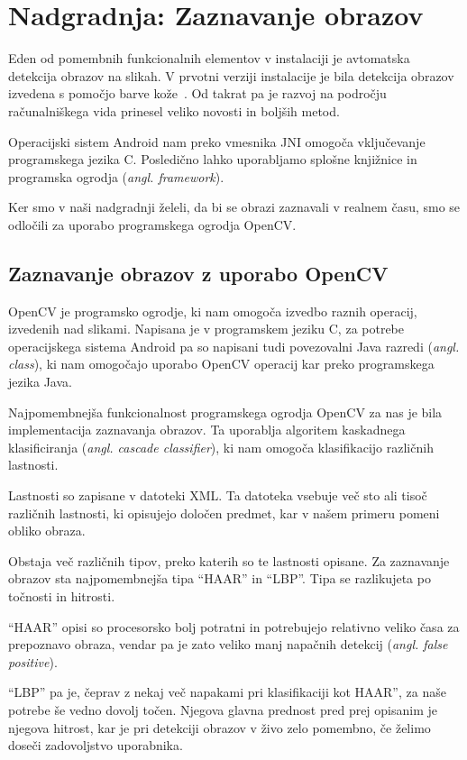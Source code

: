 \chapter{Nadgradnja: Zaznavanje obrazov}
\label{ch:zaznavanjeObrazov}
Eden od pomembnih funkcionalnih elementov v instalaciji je avtomatska
detekcija  obrazov na slikah. V prvotni verziji instalacije je bila detekcija
obrazov izvedena s pomočjo barve kože~\cite{mirage03}. Od takrat pa je razvoj
na področju računalniškega vida prinesel veliko novosti in boljših metod.

Operacijski sistem Android nam preko vmesnika JNI omogoča vključevanje
programskega jezika C. Posledično lahko uporabljamo splošne knjižnice in
programska ogrodja (\textit{angl. framework}).

Ker smo v naši nadgradnji želeli, da bi se obrazi zaznavali v realnem času,
smo se odločili za uporabo programskega ogrodja OpenCV.


\section{Zaznavanje obrazov z uporabo OpenCV}
\label{sec:zaznavanjeObrazovOpenCV}
OpenCV je programsko ogrodje, ki nam omogoča izvedbo raznih operacij,
izvedenih nad slikami. Napisana je v programskem jeziku C, za potrebe
operacijskega sistema Android pa so napisani tudi povezovalni Java razredi
(\textit{angl. class}), ki nam omogočajo uporabo OpenCV operacij kar preko
programskega jezika Java.

Najpomembnejša funkcionalnost programskega ogrodja OpenCV za nas je bila
implementacija zaznavanja obrazov. Ta uporablja algoritem kaskadnega
klasificiranja (\textit{angl. cascade classifier}), ki nam omogoča
klasifikacijo različnih lastnosti.

Lastnosti so zapisane v datoteki XML. Ta datoteka vsebuje več sto ali tisoč
različnih lastnosti, ki opisujejo določen predmet, kar v našem primeru pomeni
obliko obraza.

Obstaja več različnih tipov, preko katerih so te lastnosti opisane. Za
zaznavanje obrazov sta najpomembnejša tipa ``HAAR'' in ``LBP''. Tipa se
razlikujeta po točnosti in hitrosti.

``HAAR'' opisi so procesorsko bolj potratni in potrebujejo relativno veliko
časa za prepoznavo obraza, vendar pa je zato veliko manj napačnih detekcij
(\textit{angl. false positive}).

``LBP'' pa je, čeprav z nekaj več napakami pri klasifikaciji kot HAAR'', za
naše potrebe še vedno dovolj točen. Njegova glavna prednost pred prej
opisanim je  njegova hitrost, kar je pri detekciji obrazov v živo zelo
pomembno, če želimo doseči zadovoljstvo uporabnika.

